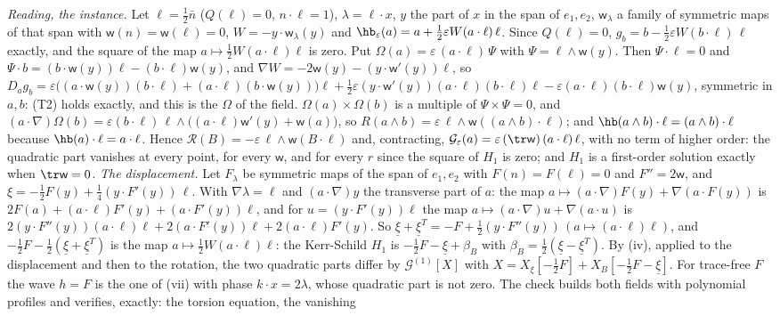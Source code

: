 \emph{Reading, the instance.} Let $\ell = \tfrac12\bar n$ ($Q(\ell) = 0$, $n \cdot \ell = 1$), $\lambda = \ell \cdot x$, $y$ the part of $x$ in the span of $e_{1}, e_{2}$, $\mathsf{w}_{\lambda}$ a family of symmetric maps of that span with $\mathsf{w}(n) = \mathsf{w}(\ell) = 0$, $W = -y \cdot \mathsf{w}_{\lambda}(y)$ and $\hb_{\varepsilon}(a) = a + \tfrac12\varepsilon W (a \cdot \ell)\,\ell$. Since $Q(\ell) = 0$, $g_{b} = b - \tfrac12\varepsilon W (b \cdot \ell)\,\ell$ exactly, and the square of the map $a \mapsto \tfrac12 W (a \cdot \ell)\ell$ is zero. Put $\Omega(a) = \varepsilon\,(a \cdot \ell)\,\Psi$ with $\Psi = \ell \wedge \mathsf{w}(y)$. Then $\Psi \cdot \ell = 0$ and $\Psi \cdot b = (b \cdot \mathsf{w}(y))\ell - (b \cdot \ell)\mathsf{w}(y)$, and $\nabla W = -2\mathsf{w}(y) - (y \cdot \mathsf{w}'(y))\ell$, so $D_{a}g_{b} = \varepsilon\bigl((a \cdot \mathsf{w}(y))(b \cdot \ell) + (a \cdot \ell)(b \cdot \mathsf{w}(y))\bigr)\ell + \tfrac12\varepsilon(y \cdot \mathsf{w}'(y))(a \cdot \ell)(b \cdot \ell)\ell - \varepsilon(a \cdot \ell)(b \cdot \ell)\mathsf{w}(y)$, symmetric in $a, b$: (T2) holds exactly, and this is the $\Omega$ of the field. $\Omega(a) \times \Omega(b)$ is a multiple of $\Psi \times \Psi = 0$, and $(a \cdot \nabla)\Omega(b) = \varepsilon(b \cdot \ell)\,\ell \wedge \bigl((a \cdot \ell)\mathsf{w}'(y) + \mathsf{w}(a)\bigr)$, so $R(a \wedge b) = \varepsilon\,\ell \wedge \mathsf{w}((a \wedge b) \cdot \ell)$; and $\hb(a \wedge b) \cdot \ell = (a \wedge b) \cdot \ell$ because $\hb(a) \cdot \ell = a \cdot \ell$. Hence $\mathcal{R}(B) = -\varepsilon\,\ell \wedge \mathsf{w}(B \cdot \ell)$ and, contracting, $\mathcal{G}_{\varepsilon}(a) = \varepsilon\,(\tr\mathsf{w})\,(a \cdot \ell)\,\ell$, with no term of higher order: the quadratic part vanishes at every point, for every $\mathsf{w}$, and for every $r$ since the square of $H_{1}$ is zero; and $H_{1}$ is a first-order solution exactly when $\tr\mathsf{w} = 0$. \emph{The displacement.} Let $F_{\lambda}$ be symmetric maps of the span of $e_{1}, e_{2}$ with $F(n) = F(\ell) = 0$ and $F'' = 2\mathsf{w}$, and $\xi = -\tfrac12 F(y) + \tfrac14(y \cdot F'(y))\,\ell$. With $\nabla\lambda = \ell$ and $(a \cdot \nabla)y$ the transverse part of $a$: the map $a \mapsto (a \cdot \nabla)F(y) + \nabla(a \cdot F(y))$ is $2F(a) + (a \cdot \ell)F'(y) + (a \cdot F'(y))\ell$, and for $u = (y \cdot F'(y))\ell$ the map $a \mapsto (a \cdot \nabla)u + \nabla(a \cdot u)$ is $2(y \cdot F''(y))(a \cdot \ell)\ell + 2(a \cdot F'(y))\ell + 2(a \cdot \ell)F'(y)$. So $\underline{\xi} + \underline{\xi}^{T} = -F + \tfrac12(y \cdot F''(y))\,(a \mapsto (a \cdot \ell)\ell)$, and $-\tfrac12 F - \tfrac12(\underline{\xi} + \underline{\xi}^{T})$ is the map $a \mapsto \tfrac12 W (a \cdot \ell)\ell$: the Kerr-Schild $H_{1}$ is $-\tfrac12 F - \underline{\xi} + \beta_{B}$ with $\beta_{B} = \tfrac12(\underline{\xi} - \underline{\xi}^{T})$. By (iv), applied to the displacement and then to the rotation, the two quadratic parts differ by $\mathcal{G}^{(1)}[X]$ with $X = X_{\xi}[-\tfrac12 F] + X_{B}[-\tfrac12 F - \underline{\xi}]$. For trace-free $F$ the wave $h = F$ is the one of (vii) with phase $k \cdot x = 2\lambda$, whose quadratic part is not zero. The check builds both fields with polynomial profiles and verifies, exactly: the torsion equation, the vanishing 
